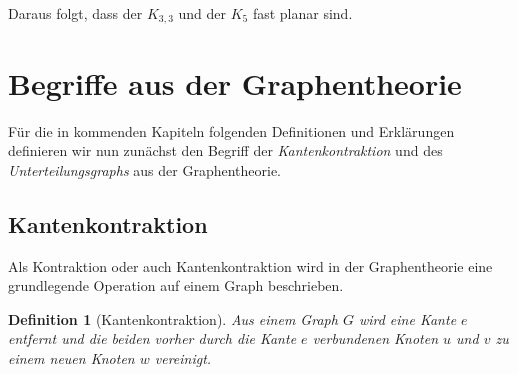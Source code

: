 \documentclass[a4paper]{article}
\newtheorem{definition}{Definition}
\begin{document}
Daraus folgt, dass der $K_{3,3}$ und der $K_5$ fast planar sind.


\section{Begriffe aus der Graphentheorie}
\label{section:begriffe_der_graphentheorie}
Für die in kommenden Kapiteln folgenden Definitionen und Erklärungen definieren wir nun zunächst den Begriff der \textit{Kantenkontraktion} und des \textit{Unterteilungsgraphs} aus der Graphentheorie.

\subsection{Kantenkontraktion}
Als Kontraktion oder auch Kantenkontraktion wird in der Graphentheorie eine grundlegende Operation auf einem Graph beschrieben.

\begin{definition}[Kantenkontraktion]
Aus einem Graph $G$ wird eine Kante $e$ entfernt und die beiden vorher durch die Kante $e$ verbundenen Knoten $u$ und $v$ zu einem neuen Knoten $w$ vereinigt.
\end{definition}
\end{document}
